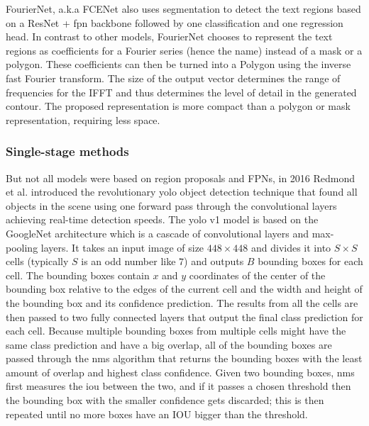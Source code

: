 \label{fcenet}FourierNet, a.k.a FCENet \cite{riaz_fouriernet_2021} also uses segmentation to detect the text regions based on a ResNet \cite{he_deep_2016} + \gls{fpn} backbone followed by one classification and one regression head. In contrast to other models, FourierNet chooses to represent the text regions as coefficients for a Fourier series (hence the name) instead of a mask or a polygon. These coefficients can then be turned into a Polygon using the inverse fast Fourier transform. The size of the output vector determines the range of frequencies for the IFFT and thus determines the level of detail in the generated contour. The proposed representation is more compact than a polygon or mask representation, requiring less space.

 \subsubsection*{Single-stage methods}

But not all models were based on region proposals and FPNs, in 2016 Redmond et al. introduced the revolutionary \gls{yolo} object detection technique that found all objects in the scene using one forward pass through the convolutional layers achieving real-time detection speeds. The \gls{yolo} v1 model is based on the GoogleNet \cite{szegedy_going_2015} architecture which is a cascade of convolutional layers and max-pooling layers. It takes an input image of size $448\times448$ and divides it into $S\times S$ cells (typically $S$ is an odd number like $7$) and outputs $B$ bounding boxes for each cell. The bounding boxes contain $x$ and $y$ coordinates of the center of the bounding box relative to the edges of the current cell and the width and height of the bounding box and its confidence prediction. The results from all the cells are then passed to two fully connected layers that output the final class prediction for each cell. Because multiple bounding boxes from multiple cells might have the same class prediction and have a big overlap, all of the bounding boxes are passed through the \gls{nms} algorithm that returns the bounding boxes with the least amount of overlap and highest class confidence. Given two bounding boxes, \gls{nms} first measures the \gls{iou} between the two, and if it passes a chosen threshold then the bounding box with the smaller confidence gets discarded; this is then repeated until no more boxes have an IOU bigger than the threshold.

